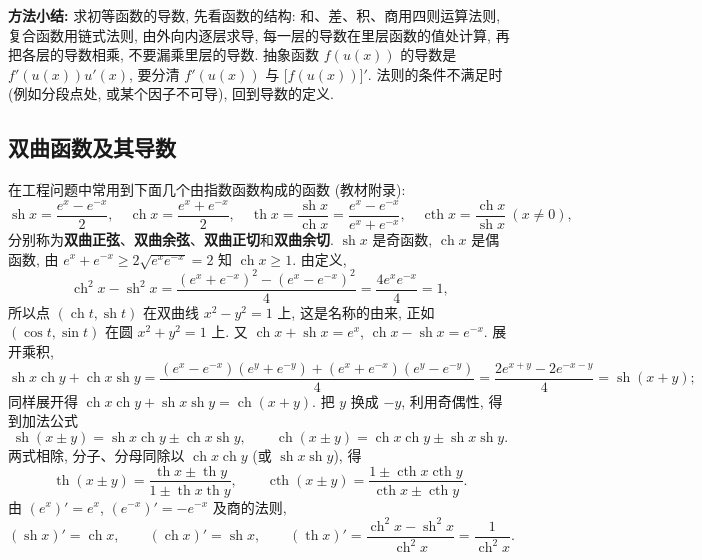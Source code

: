 \documentclass[UTF8,openany]{ctexbook}
\theoremstyle{chinesetextbook}
\begin{document}
\par\indent\textbf{方法小结:} 求初等函数的导数, 先看函数的结构: 和、差、积、商用四则运算法则, 复合函数用链式法则, 由外向内逐层求导, 每一层的导数在里层函数的值处计算, 再把各层的导数相乘, 不要漏乘里层的导数. 抽象函数 $f(u(x))$ 的导数是 $f'(u(x))u'(x)$, 要分清 $f'(u(x))$ 与 $\bigl[f(u(x))\bigr]'$. 法则的条件不满足时 (例如分段点处, 或某个因子不可导), 回到导数的定义.
\subsection{双曲函数及其导数}
在工程问题中常用到下面几个由指数函数构成的函数 (教材附录):
\[
\operatorname{sh}x=\frac{e^x-e^{-x}}2,\quad\operatorname{ch}x=\frac{e^x+e^{-x}}2,\quad\operatorname{th}x=\frac{\operatorname{sh}x}{\operatorname{ch}x}=\frac{e^x-e^{-x}}{e^x+e^{-x}},\quad\operatorname{cth}x=\frac{\operatorname{ch}x}{\operatorname{sh}x}\ (x\ne0),
\]
分别称为\textbf{双曲正弦}、\textbf{双曲余弦}、\textbf{双曲正切}和\textbf{双曲余切}. $\operatorname{sh}x$ 是奇函数, $\operatorname{ch}x$ 是偶函数, 由 $e^x+e^{-x}\ge2\sqrt{e^xe^{-x}}=2$ 知 $\operatorname{ch}x\ge1$. 由定义,
\[
\operatorname{ch}^2x-\operatorname{sh}^2x=\frac{(e^x+e^{-x})^2-(e^x-e^{-x})^2}4=\frac{4e^xe^{-x}}4=1,
\]
所以点 $(\operatorname{ch}t,\operatorname{sh}t)$ 在双曲线 $x^2-y^2=1$ 上, 这是名称的由来, 正如 $(\cos t,\sin t)$ 在圆 $x^2+y^2=1$ 上. 又 $\operatorname{ch}x+\operatorname{sh}x=e^x$, $\operatorname{ch}x-\operatorname{sh}x=e^{-x}$. 展开乘积,
\[
\operatorname{sh}x\operatorname{ch}y+\operatorname{ch}x\operatorname{sh}y=\frac{(e^x-e^{-x})(e^y+e^{-y})+(e^x+e^{-x})(e^y-e^{-y})}4=\frac{2e^{x+y}-2e^{-x-y}}4=\operatorname{sh}(x+y);
\]
同样展开得 $\operatorname{ch}x\operatorname{ch}y+\operatorname{sh}x\operatorname{sh}y=\operatorname{ch}(x+y)$. 把 $y$ 换成 $-y$, 利用奇偶性, 得到加法公式
\[
\operatorname{sh}(x\pm y)=\operatorname{sh}x\operatorname{ch}y\pm\operatorname{ch}x\operatorname{sh}y,\qquad\operatorname{ch}(x\pm y)=\operatorname{ch}x\operatorname{ch}y\pm\operatorname{sh}x\operatorname{sh}y.
\]
两式相除, 分子、分母同除以 $\operatorname{ch}x\operatorname{ch}y$ (或 $\operatorname{sh}x\operatorname{sh}y$), 得
\[
\operatorname{th}(x\pm y)=\frac{\operatorname{th}x\pm\operatorname{th}y}{1\pm\operatorname{th}x\operatorname{th}y},\qquad\operatorname{cth}(x\pm y)=\frac{1\pm\operatorname{cth}x\operatorname{cth}y}{\operatorname{cth}x\pm\operatorname{cth}y}.
\]
由 $(e^x)'=e^x$, $(e^{-x})'=-e^{-x}$ 及商的法则,
\[
(\operatorname{sh}x)'=\operatorname{ch}x,\qquad(\operatorname{ch}x)'=\operatorname{sh}x,\qquad(\operatorname{th}x)'=\frac{\operatorname{ch}^2x-\operatorname{sh}^2x}{\operatorname{ch}^2x}=\frac1{\operatorname{ch}^2x}.
\]
\end{document}
